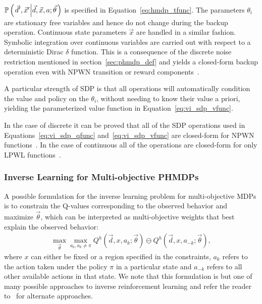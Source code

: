{\footnotesize $\mathbb{P}\left({\left. \vec{d}', \vec{x}' \middle| \vec{d}, \vec{x}, a; \vec{\theta} \right.}\right)$ } is specified in Equation~\eqref{eq:hmdp_tfunc}. The parameters {\footnotesize $\theta_i$} are stationary free variables and hence do not change during the backup operation. Continuous state parameters {\footnotesize $ \vec{x} $} are handled in a similar fashion. Symbolic integration over continuous variables are carried out with respect to a deterministic Dirac {\footnotesize $\delta$} function. This is a consequence of the discrete noise restriction mentioned in section~\ref{sec:phmdp_def} and yields a closed-form backup operation even with NPWN transition or reward components~\cite{Sanner_UAI_2011}. 

A particular strength of SDP is that all operations will automatically condition the value and policy on the {\footnotesize $\theta_i$}, without needing to know their value a priori, yielding the parameterized value function in Equation~\eqref{eq:vi_sdp_vfunc}.


In the case of discrete {\footnotesize \Action} it can be proved that all of the SDP operations used in Equations~\eqref{eq:vi_sdp_qfunc} and~\eqref{eq:vi_sdp_vfunc} are closed-form for NPWN functions~\cite{Sanner_UAI_2011}. In the case of continuous {\footnotesize \Action} all of the operations are closed-form for only LPWL functions~\cite{Zamani_AAAI_2012}.

\subsubsection{Inverse Learning for Multi-objective PHMDPs}

A possible formulation for the inverse learning problem for multi-objective MDPs is to constrain the Q-values corresponding to the observed behavior and maximize {\footnotesize $\vec{\theta}$}, which can be interpreted as multi-objective weights that best explain the observed behavior: 
\begin{align}
    \label{eq:irl_q}
    \max_{\vec{\theta}} \max_{a_k, a_k \neq \pi } Q^{h} \left(\vec{d}, x, a_k; \vec{\theta} \right) \ominus Q^{h} \left(\vec{d}, x, a_{-k}; \vec{\theta} \right),
\end{align}
where {\footnotesize $ x $} can either be fixed or a region specified in the constraints, {\footnotesize $a_{k}$} refers to the action taken under the policy {\footnotesize $\pi$} in a particular state and {\footnotesize $a_{-k}$} refers to all other available actions in that state. We note that this formulation is but one of many possible approaches to inverse reinforcement learning and refer the reader to~\cite{Ng_ICML_2000} for alternate approaches. 

